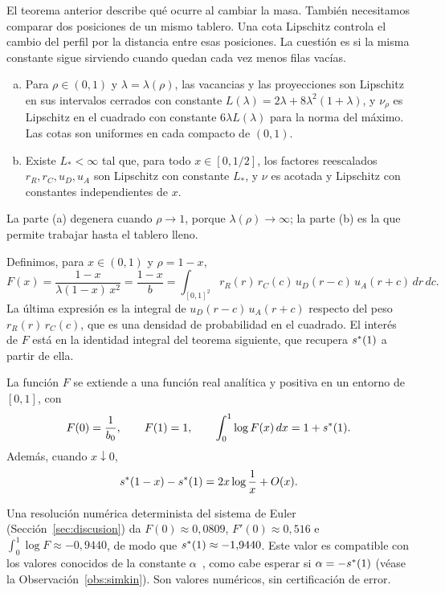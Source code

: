 El teorema anterior describe qué ocurre al cambiar la masa. También necesitamos
comparar dos posiciones de un mismo tablero. Una cota Lipschitz controla el cambio
del perfil por la distancia entre esas posiciones. La cuestión es si la misma
constante sigue sirviendo cuando quedan cada vez menos filas vacías.

\begin{teorema}\label{thm:lipschitz_intro}
\begin{enumerate}[(a)]
\item Para $\rho\in(0,1)$ y $\lambda=\lambda(\rho)$, las vacancias y las proyecciones son Lipschitz en
sus intervalos cerrados con constante $L(\lambda)=2\lambda+8\lambda^2(1+\lambda)$, y $\nu_\rho$ es
Lipschitz en el cuadrado con constante $6\lambda L(\lambda)$ para la norma del máximo. Las cotas son
uniformes en cada compacto de $(0,1)$.
\item Existe $L_*<\infty$ tal que, para todo $x\in[0,1/2]$, los factores reescalados
$r_R,r_C,u_D,u_A$ son Lipschitz con constante $L_*$, y $\nu$ es acotada y Lipschitz con constantes
independientes de $x$.
\end{enumerate}
\end{teorema}

La parte (a) degenera cuando $\rho\to1$, porque $\lambda(\rho)\to\infty$; la parte (b) es la que
permite trabajar hasta el tablero lleno.

Definimos, para $x\in(0,1)$ y $\rho=1-x$,
\begin{equation}\label{eq:F}
 F(x)=\frac{1-x}{\lambda(1-x)\,x^2}=\frac{1-x}{b}=\int_{[0,1]^2}r_R(r)\,r_C(c)\,u_D(r-c)\,u_A(r+c)\,dr\,dc .
\end{equation}
La última expresión es la integral de $u_D(r-c)\,u_A(r+c)$ respecto del peso $r_R(r)\,r_C(c)$,
que es una densidad de probabilidad en el cuadrado. El interés de $F$ está en la identidad
integral del teorema siguiente, que recupera $s^{*}(1)$ a partir de ella.

\begin{teorema}\label{thm:F_intro}
La función $F$ se extiende a una función real analítica y positiva en un entorno de $[0,1]$, con
\[
 F(0)=\frac1{b_0},\qquad F(1)=1,\qquad \int_0^1\log F(x)\,dx=1+s^{*}(1).
\]
Además, cuando $x\downarrow0$,
\[
 s^{*}(1-x)-s^{*}(1)=2x\log\frac1x+O(x).
\]
\end{teorema}

\begin{observacion}
Una resolución numérica determinista del sistema de Euler (Sección~\ref{sec:discusion}) da
$F(0)\approx0{,}0809$, $F'(0)\approx0{,}516$ e $\int_0^1\log F\approx-0{,}9440$, de modo que
$s^{*}(1)\approx-1{,}9440$. Este valor es compatible con los valores conocidos de la constante
$\alpha$~\cite{Simkin,NAB}, como cabe esperar si $\alpha=-s^{*}(1)$
(véase la Observación~\ref{obs:simkin}). Son valores numéricos, sin
certificación de error.
\end{observacion}

